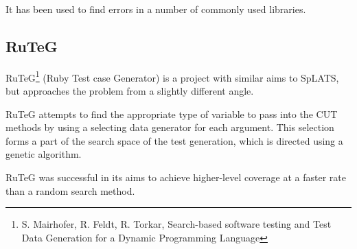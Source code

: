     It has been used to find errors in a number of commonly used libraries.

  \subsection{RuTeG}
    RuTeG\footnote{S. Mairhofer, R. Feldt, R. Torkar, Search-based software
testing and Test Data Generation for a Dynamic Programming Language} (Ruby Test
case Generator) is a project with similar aims to SpLATS, but approaches the
problem from a slightly different angle.

RuTeG attempts to find the appropriate type of variable to pass into the CUT
methods by using a selecting data generator for each argument. This selection
forms a part of the search space of the test generation, which is directed using
a genetic algorithm.

RuTeG was successful in its aims to achieve higher-level coverage at a faster
rate than a random search method.
